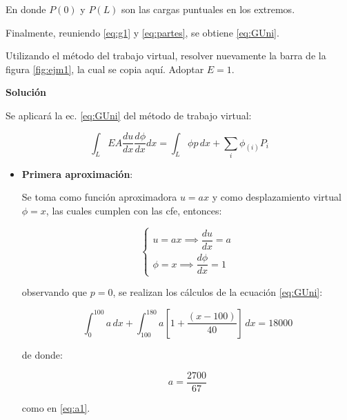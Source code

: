 En donde $P(0)$ y $P(L)$ son las cargas puntuales en los extremos.

Finalmente, reuniendo \eqref{eq:g1} y \eqref{eq:partes}, se obtiene \eqref{eq:GUni}.
\begin{example}
	Utilizando el método del trabajo virtual, resolver nuevamente la barra de la figura \ref{fig:ejm1}, la cual se copia aquí. Adoptar $E=1$.
	
	\begin{figure}[H]
		\centering
		
	\end{figure}
	
\textbf{Solución}

		Se aplicará la ec. \eqref{eq:GUni} del método de trabajo virtual:
		
		\begin{equation*}
			\int_L EA \dfrac{du}{dx} \dfrac{d \phi}{dx} dx = \int_L \phi p \, dx + \sum_i \phi_{(i)} P_i
		\end{equation*}
		
		\begin{itemize}
			\item \textbf{Primera aproximación}:
			
			Se toma como función aproximadora $u = ax$ y como desplazamiento virtual $\phi = x$, las cuales cumplen con las \acrlong{cfe}, entonces:
			
			\begin{equation}
				\begin{cases}
					u = a x \implies \dfrac{du}{dx} = a\\[4mm]
					\phi = x \implies \dfrac{d \phi}{dx} = 1
				\end{cases}
			\end{equation}
			
			observando que $p=0$, se realizan los cálculos de la ecuación \eqref{eq:GUni}:
			
			\begin{equation}
				\int_{0}^{100} a \, dx + \int_{100}^{180} a\left[1 + \dfrac{\left(x-100\right)}{40}\right]\, dx = 18000
			\end{equation}
			
			de donde:
			
			\begin{equation}
				a = \dfrac{2700}{67}
			\end{equation}
			
			como en \eqref{eq:a1}.
			

\end{itemize}
\end{example}
